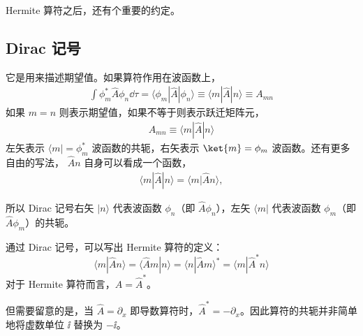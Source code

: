 Hermite 算符之后，还有个重要的约定。

\subsection{Dirac 记号}

它是用来描述期望值。如果算符作用在波函数上，
\begin{eqnarray}
    \int \phi_m^* \hat A \phi_n \dd\tau = \langle \phi_m | \hat A | \phi_n \rangle \equiv \langle m | \hat A | n \rangle \equiv A_{mn}
\end{eqnarray}
如果 $m = n$ 则表示期望值，如果不等于则表示跃迁矩阵元，
\begin{eqnarray}
    A_{mn} \equiv \langle m | \hat A | n \rangle
\end{eqnarray}
左矢表示 $\langle m| = \phi_m^*$ 波函数的共轭，右矢表示 $\ket{m} = \phi_m$ 波函数。还有更多自由的写法，
$\hat A n$ 自身可以看成一个函数，
\begin{eqnarray}
    \langle m | \hat A | n \rangle = \langle m | \hat A n \rangle,
\end{eqnarray}

所以 Dirac 记号右矢 $|n\rangle$ 代表波函数 $\phi_n$（即 $\hat A \phi_n$），左矢 $\langle m |$ 代表波函数 $\phi_m$（即 $\hat A \phi_m$）的共轭。


通过 Dirac 记号，可以写出 Hermite 算符的定义：
\begin{equation}
  \langle m | \hat A n \rangle = \langle \hat A m | n \rangle = \langle n | \hat A m \rangle^* = \langle m | \hat A^* n \rangle
\end{equation}
对于 Hermite 算符而言，$\hat A = \hat A^*$。

但需要留意的是，当 $\hat A = \partial_x$ 即导数算符时，$\hat A^* = - \partial_x$。因此算符的共轭并非简单地将虚数单位 $\ii$ 替换为 $-\ii$。


